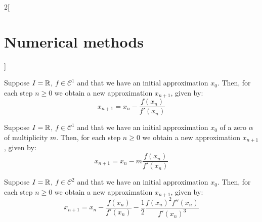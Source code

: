 \documentclass[../../../main.tex]{subfiles}
\begin{document}
\begin{multicols}{2}[\section{Numerical methods}]
\begin{method}
        Suppose $I=\mathbb{R}$, $f\in\mathcal{C}^1$ and that we have an initial approximation $x_0$. Then, for each step $n\geq 0$ we obtain a new approximation $x_{n+1}$, given by: $$x_{n+1}=x_n-\frac{f(x_n)}{f'(x_n)}$$
    \end{method}
    \begin{method}
        Suppose $I=\mathbb{R}$, $f\in\mathcal{C}^1$ and that we have an initial approximation $x_0$ of a zero $\alpha$ of multiplicity $m$. Then, for each step $n\geq 0$ we obtain a new approximation $x_{n+1}$, given by: $$x_{n+1}=x_n-m\frac{f(x_n)}{f'(x_n)}$$
    \end{method}
    \begin{method}
        Suppose $I=\mathbb{R}$, $f\in\mathcal{C}^2$ and that we have an initial approximation $x_0$. Then, for each step $n\geq 0$ we obtain a new approximation $x_{n+1}$, given by: $$x_{n+1}=x_n-\frac{f(x_n)}{f'(x_n)}-\frac{1}{2}\frac{{f(x_n)}^2f''(x_n)}{{f'(x_n)}^3}$$
    \end{method}

\end{multicols}
\end{document}
